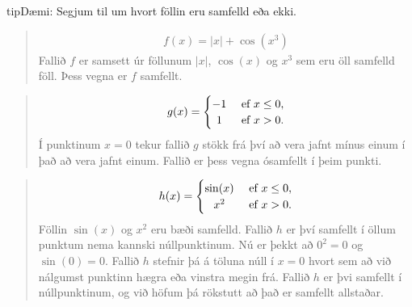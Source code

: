 \documentclass[a4paper,10pt,icelandic]{sphinxmanual}
\begin{document}
\begin{sphinxadmonition}{tip}{Dæmi:}
Segjum til um hvort föllin eru samfelld eða ekki.

\begin{quote}
\begin{equation*}
\begin{split}f(x)=|x|+\cos(x^3)\end{split}
\end{equation*}
Fallið \(f\) er samsett úr föllunum \(|x|\), \(\cos(x)\) og \(x^3\) sem eru öll samfelld föll. Þess vegna er \(f\) samfellt.
\end{quote}

\begin{quote}
\begin{equation*}
\begin{split}g(x) =
\begin{cases}
        \hfill -1    \hfill & \text{ ef } x\leq 0,\\
        \hfill  1 \hfill & \text{ ef } x>0.\\
\end{cases}\end{split}
\end{equation*}
Í punktinum \(x=0\) tekur fallið \(g\) stökk frá því að vera jafnt mínus einum í það að vera jafnt einum. Fallið er þess vegna ósamfellt í þeim punkti.
\end{quote}

\begin{quote}
\begin{equation*}
\begin{split}h(x) =
\begin{cases}
        \hfill \sin(x)    \hfill & \text{ ef } x\leq 0,\\
        \hfill  x^2 \hfill & \text{ ef } x>0.\\
\end{cases}\end{split}
\end{equation*}
Föllin \(\sin(x)\) og \(x^2\) eru bæði samfelld. Fallið \(h\) er því samfellt í öllum punktum nema kannski núllpunktinum.
Nú er þekkt að \(0^2=0\) og \(\sin(0)=0\).
Fallið \(h\) stefnir þá á töluna núll í \(x=0\) hvort sem að við nálgumst punktinn hægra eða vinstra megin frá. Fallið \(h\) er þvi samfellt í núllpunktinum, og við höfum þá rökstutt að það er samfellt allstaðar.
\end{quote}
\end{sphinxadmonition}
\end{document}
